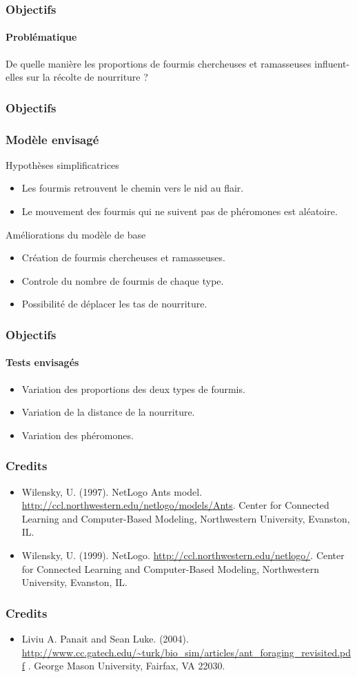 \documentclass[11pt]{beamer}
\begin{document}
\begin{frame}
\frametitle{Objectifs}
\framesubtitle{Problématique}
\begin{center} De quelle manière les proportions de fourmis chercheuses et ramasseuses influent-elles sur la récolte de nourriture ?
\end{center}
\end{frame}

\begin{frame}

\frametitle{Objectifs}
\frametitle{Modèle envisagé}
\begin{block}{Hypothèses simplificatrices}
\begin{itemize}
\item Les fourmis retrouvent le chemin vers le nid au flair.
\item Le mouvement des fourmis qui ne suivent pas de phéromones est aléatoire.
\end{itemize}
\end{block}
\begin{block}{Améliorations du modèle de base}
\begin{itemize}
\item Création de fourmis chercheuses et ramasseuses.
\item Controle du nombre de fourmis de chaque type.
\item Possibilité de déplacer les tas de nourriture.
\end{itemize}
\end{block}
\end{frame}

\begin{frame}
\frametitle{Objectifs}
\framesubtitle{Tests envisagés}
\begin{itemize}
\item Variation des proportions des deux types de fourmis.
\item Variation de la distance de la nourriture.
\item Variation des phéromones.

\end{itemize}
\end{frame}

\begin{frame}
\frametitle{Credits}
\begin{itemize}
\item Wilensky, U. (1997). NetLogo Ants model. \url{http://ccl.northwestern.edu/netlogo/models/Ants}. Center for Connected Learning and Computer-Based Modeling, Northwestern University, Evanston, IL.
\item Wilensky, U. (1999). NetLogo. \url{http://ccl.northwestern.edu/netlogo/}. Center for Connected Learning and Computer-Based Modeling, Northwestern University, Evanston, IL.
\end{itemize}
\end{frame}

\begin{frame}
\frametitle{Credits}
\begin{itemize}
\item Liviu A. Panait and Sean Luke. (2004). \url{http://www.cc.gatech.edu/~turk/bio_sim/articles/ant_foraging_revisited.pdf} . George Mason University, Fairfax, VA 22030.
\end{itemize}
\end{frame}
\end{document}
